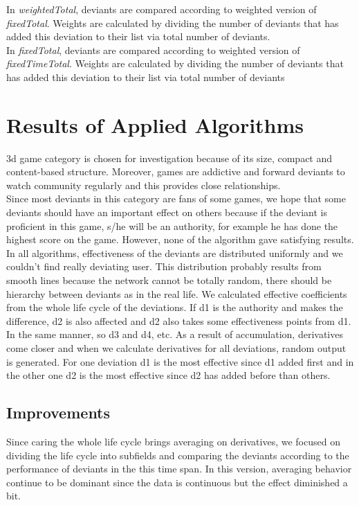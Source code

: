 \documentclass[12pt,a4paper]{report}
\begin{document}
          In \emph{weightedTotal}, deviants are compared according to weighted version of \emph{fixedTotal}. Weights are calculated by dividing the number of deviants that has added this deviation to their list via total number of deviants. \\

          In \emph{fixedTotal}, deviants are compared according to weighted version of \emph{fixedTimeTotal}. Weights are calculated by dividing the number of deviants that has added this deviation to their list via total number of deviants

\chapter{Results of Applied Algorithms}

	3d game category is chosen for investigation because of its size, compact and content-based structure. Moreover, games are addictive and forward deviants to watch community regularly and this provides close relationships. \\

	Since most deviants in this category are fans of some games, we hope that some deviants should have an important effect on others because if the deviant is proficient in this game, s/he will be an authority, for example he has done the highest score on the game. However, none of the algorithm gave satisfying results. In all algorithms, effectiveness of the deviants are distributed uniformly and we couldn't find really deviating user. This distribution  probably results from smooth lines because the network cannot be totally random, there should be hierarchy between deviants as in the real life. We calculated effective coefficients from the whole life cycle of the deviations. If d1 is the authority and makes the difference, d2 is also affected and d2 also takes some effectiveness points from d1. In the same manner, so d3 and d4, etc. As a result of accumulation, derivatives come closer and when we calculate derivatives for all deviations, random output is generated. For one deviation d1 is the most effective since d1 added first and in the other one d2 is the most effective since d2 has added before than others. \\

\section{Improvements}

	Since caring the whole life cycle brings averaging on derivatives, we focused on dividing the life cycle into subfields and comparing the deviants according to the performance of deviants in the this time span. In this version, averaging behavior continue to be dominant since the data is continuous but the effect diminished a bit.
\end{document}
